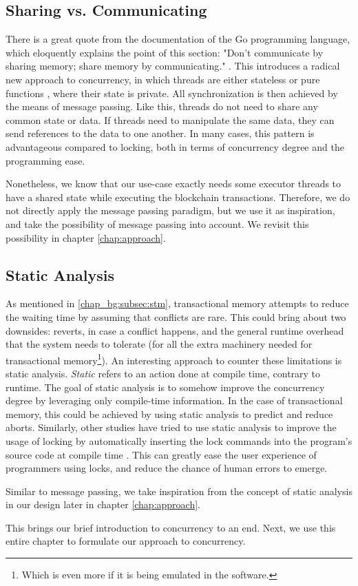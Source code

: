 \subsection{Sharing vs. Communicating}\label{chap_bg:subsec:sharing_communication}

There is a great quote from the documentation of the Go programming language, which eloquently
explains the point of this section: "Don't communicate by sharing memory; share memory by
communicating." \cite{ShareMemoryCommunicating}. This introduces a radical new approach to
concurrency, in which threads are either stateless or pure functions
\cite{MostlyAdequateMostlyadequateguide}, where their state is private. All synchronization is then
achieved by the means of message passing. Like this, threads do not need to share any common state
or data. If threads need to manipulate the same data, they can send references to the data to one
another. In many cases, this pattern is advantageous compared to locking, both in terms of
concurrency degree and the programming ease.

Nonetheless, we know that our use-case exactly needs some executor threads to have a shared state
while executing the blockchain transactions. Therefore, we do not directly apply the message passing
paradigm, but we use it as inspiration, and take the possibility of message passing into account. We
revisit this possibility in chapter \ref{chap:approach}.

\subsection{Static Analysis}

As mentioned in \ref{chap_bg:subsec:stm}, transactional memory attempts to reduce the waiting time
by assuming that conflicts are rare. This could bring about two downsides: reverts, in case a
conflict happens, and the general runtime overhead that the system needs to tolerate (for all the
extra machinery needed for transactional memory\footnote{Which is even more if it is being emulated
in the software.}). An interesting approach to counter these limitations is static analysis.
\textit{Static} refers to an action done at compile time, contrary to runtime. The goal of static
analysis is to somehow improve the concurrency degree by leveraging only compile-time information.
In the case of transactional memory, this could be achieved by using static analysis to predict and
reduce aborts\cite{diasEfficientCorrectTransactional}. Similarly, other studies have tried to use
static analysis to improve the usage of locking by automatically inserting the lock commands into
the program's source code at compile time \cite{cheremInferringLocksAtomic2007}. This can greatly
ease the user experience of programmers using locks, and reduce the chance of human errors to
emerge.

Similar to message passing, we take inspiration from the concept of static analysis in our design
later in chapter \ref{chap:approach}.

This brings our brief introduction to concurrency to an end. Next, we use this entire chapter to
formulate our approach to concurrency.

